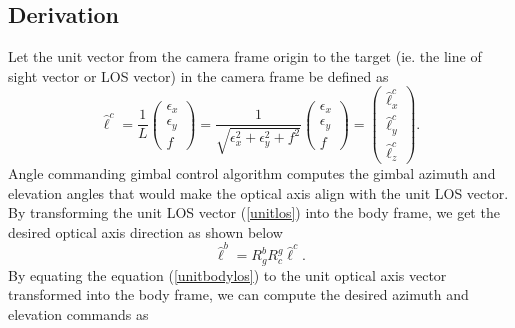 \subsection{Derivation}
Let the unit vector from the camera frame origin to the target (ie. the line of sight vector or LOS vector) in the camera frame be defined as 
\begin{equation}
\hat{\ell}^c=\frac{1}{L}
\begin{pmatrix}
\epsilon_x \\
\epsilon_y \\
f
\end{pmatrix}
=\frac{1}{\sqrt{\epsilon_x^2+\epsilon_y^2+f^2}}
\begin{pmatrix}
\epsilon_x \\
\epsilon_y \\
f
\end{pmatrix}
=\begin{pmatrix}
\hat{\ell}_x^c \\
\hat{\ell}_y^c \\
\hat{\ell}_z^c
\end{pmatrix}.
\label{unitlos}
\end{equation}
Angle commanding gimbal control algorithm computes the gimbal azimuth and elevation angles that would make the optical axis align with the unit LOS vector. By transforming the unit LOS vector (\ref{unitlos}) into the body frame, we get the desired optical axis direction as shown below
\begin{equation}
\hat{\ell}^b=R_{g}^b R_{c}^g\hat{\ell}^c.
\label{unitbodylos}
\end{equation}
By equating the equation (\ref{unitbodylos}) to the unit optical axis vector transformed into the body frame, we can compute the desired azimuth and elevation commands as

